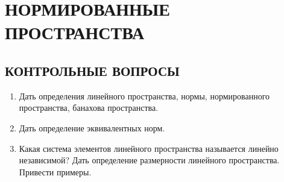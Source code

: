 \documentclass[12pt,a4paper]{article}
\begin{document}
\section{НОРМИРОВАННЫЕ ПРОСТРАНСТВА}

\subsection*{КОНТРОЛЬНЫЕ ВОПРОСЫ}
\begin{enumerate}
\item Дать определения линейного пространства, нормы, нормированного пространства, банахова пространства.
\item Дать определение эквивалентных норм.
\item Какая система элементов линейного пространства называется линейно независимой? Дать определение размерности линейного пространства. Привести примеры.
\end{enumerate}
\end{document}
